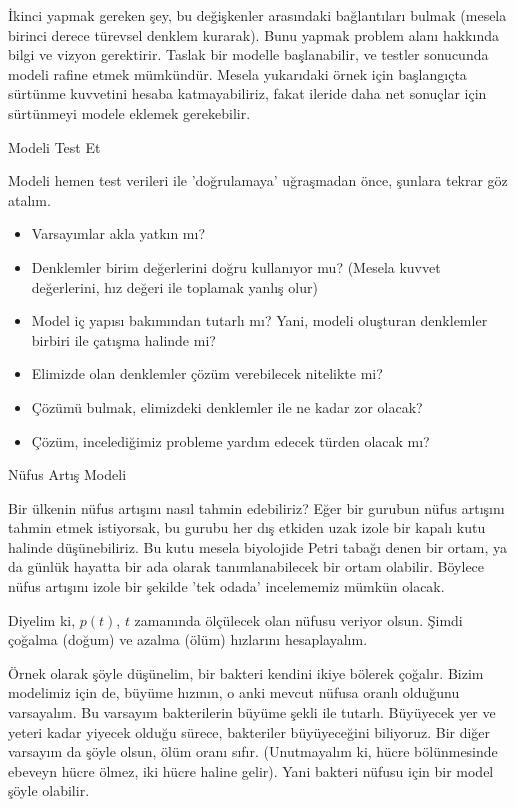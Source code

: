 \documentclass[12pt,fleqn]{article}\usepackage{../../common}
\begin{document}
İkinci yapmak gereken şey, bu değişkenler arasındaki bağlantıları bulmak
(mesela birinci derece türevsel denklem kurarak). Bunu yapmak problem alanı
hakkında bilgi ve vizyon gerektirir. Taslak bir modelle başlanabilir, ve
testler sonucunda modeli rafine etmek mümkündür. Mesela yukarıdaki örnek
için başlangıçta sürtünme kuvvetini hesaba katmayabiliriz, fakat ileride
daha net sonuçlar için sürtünmeyi modele eklemek gerekebilir.

Modeli Test Et

Modeli hemen test verileri ile 'doğrulamaya' uğraşmadan önce, şunlara
tekrar göz atalım.

\begin{itemize}
   \item Varsayımlar akla yatkın mı?
   \item Denklemler birim değerlerini doğru kullanıyor mu? (Mesela kuvvet
     değerlerini, hız değeri ile toplamak yanlış olur) 
   \item Model iç yapısı bakımından tutarlı mı? Yani, modeli oluşturan
     denklemler birbiri ile çatışma halinde mi?
   \item Elimizde olan denklemler çözüm verebilecek nitelikte mi?
   \item Çözümü bulmak, elimizdeki denklemler ile ne kadar zor olacak?
   \item Çözüm, incelediğimiz probleme yardım edecek türden olacak mı?
\end{itemize}

Nüfus Artış Modeli

Bir ülkenin nüfus artışını nasıl tahmin edebiliriz? Eğer bir gurubun nüfus
artışını tahmin etmek istiyorsak, bu gurubu her dış etkiden uzak izole bir
kapalı kutu halinde düşünebiliriz. Bu kutu mesela biyolojide Petri tabağı
denen bir ortam, ya da günlük hayatta bir ada olarak tanımlanabilecek bir
ortam olabilir. Böylece nüfus artışını izole bir şekilde 'tek odada'
incelememiz mümkün olacak.

Diyelim ki, $p(t)$, $t$ zamanında ölçülecek olan nüfusu veriyor
olsun. Şimdi çoğalma (doğum) ve azalma (ölüm) hızlarını hesaplayalım.

Örnek olarak şöyle düşünelim, bir bakteri kendini ikiye bölerek
çoğalır. Bizim modelimiz için de, büyüme hızının, o anki mevcut nüfusa
oranlı olduğunu varsayalım. Bu varsayım bakterilerin büyüme şekli ile
tutarlı. Büyüyecek yer ve yeteri kadar yiyecek olduğu sürece, bakteriler
büyüyeceğini biliyoruz. Bir diğer varsayım da şöyle olsun, ölüm oranı
sıfır. (Unutmayalım ki, hücre bölünmesinde ebeveyn hücre ölmez, iki hücre
haline gelir). Yani bakteri nüfusu için bir model şöyle olabilir.
\end{document}
